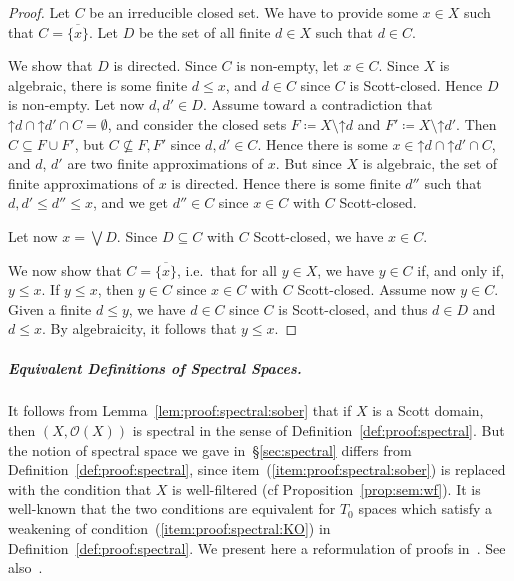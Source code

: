 \documentclass[%
  a4paper,
  UKenglish,
  cleveref,
  autoref,
  thm-restate,
  numberwithinsect,
]{lipics-v2021}
\newcommand\sle\subseteq
\newcommand\deq\coloneqq
\newcommand\up{\mathord{\uparrow}}
\newcommand\clos[1]{\overline{#1}}	%
\newcommand\Open{\mathcal{O}}		%
\begin{document}
\begin{proof}
Let $C$ be an irreducible closed set.
We have to provide some $x \in X$ such that $C = \clos{\{x\}}$.
Let $D$ be the set of all finite $d \in X$ such that
$d \in C$.

We show that $D$ is directed.
Since $C$ is non-empty, let $x \in C$.
Since $X$ is algebraic, there is some finite $d \leq x$,
and $d \in C$ since $C$ is Scott-closed.
Hence $D$ is non-empty.
Let now $d, d' \in D$.
Assume toward a contradiction that 
$\up d \cap \up d' \cap C = \emptyset$,
and consider the closed sets $F \deq X \setminus \up d$
and $F' \deq X \setminus \up d'$.
Then $C \sle F \cup F'$, but $C \not\sle F, F'$
since $d,d' \in C$.
Hence there is some $x \in \up d \cap \up d' \cap C$,
and $d$, $d'$ are two finite approximations of $x$.
But since $X$ is algebraic, the set of finite approximations of $x$
is directed.
Hence there is some finite $d''$ such that $d,d' \leq d'' \leq x$,
and we get $d'' \in C$ since $x \in C$ with $C$ Scott-closed.

Let now $x = \bigvee D$.
Since $D \sle C$ with $C$ Scott-closed, we have $x \in C$.

We now show that $C = \clos{\{x\}}$,
i.e.\ that for all $y \in X$, we have $y \in C$ if, and only if, $y \leq x$.
If $y \leq x$, then $y \in C$ since $x \in C$ with $C$ Scott-closed.
Assume now $y \in C$.
Given a finite $d \leq y$, we have $d \in C$ since $C$ is Scott-closed,
and thus $d \in D$ and $d \leq x$.
By algebraicity, it follows that $y \leq x$.
\end{proof}

\subparagraph*{Equivalent Definitions of Spectral Spaces.}
It follows from Lemma~\ref{lem:proof:spectral:sober}
that if $X$ is a Scott domain, then $(X, \Open(X))$
is spectral in the sense of Definition~\ref{def:proof:spectral}.
%
But the notion of spectral space we gave in~\S\ref{sec:spectral}
differs from Definition~\ref{def:proof:spectral},
since item~(\ref{item:proof:spectral:sober}) is replaced with the condition that $X$
is well-filtered (cf Proposition~\ref{prop:sem:wf}).
It is well-known that the two conditions are equivalent for $T_0$ spaces
which satisfy a weakening of condition~(\ref{item:proof:spectral:KO})
in Definition~\ref{def:proof:spectral}.
We present here a reformulation
of proofs in~\cite[\S 8.3]{goubault13book}.
See also~\cite[\S 6.1 and Exercise 6.3.6]{gg24book}.
\end{document}
